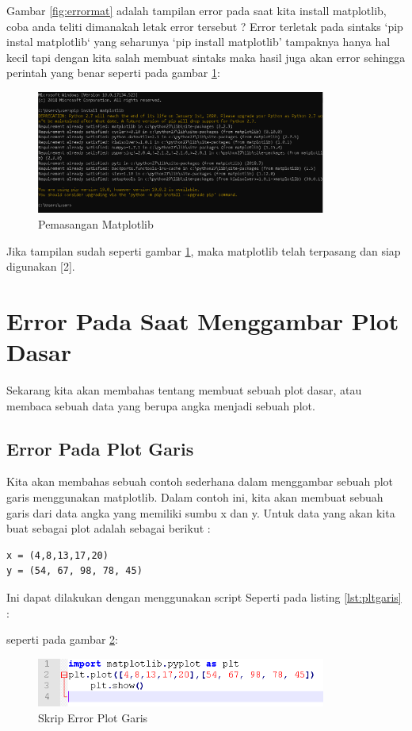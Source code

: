 Gambar \ref{fig:errormat} adalah tampilan error pada saat kita install matplotlib, coba anda teliti dimanakah letak error tersebut ? 
Error terletak pada sintaks ‘pip instal matplotlib‘ yang seharunya ‘pip install matplotlib’ tampaknya hanya hal kecil tapi dengan kita salah membuat sintaks maka hasil juga akan error sehingga perintah yang benar seperti pada gambar \ref{fig:pasangmat}:
\begin{figure}[!htbp]
	\centerline{\includegraphics[width=0.85\textwidth]{figures/6/pasangmat.PNG}}
	\caption{Pemasangan Matplotlib}
	\label{fig:pasangmat}
\end{figure} 

Jika tampilan sudah seperti gambar \ref{fig:pasangmat}, maka matplotlib telah terpasang dan siap digunakan [2].

\section{Error Pada Saat Menggambar Plot Dasar}
Sekarang kita akan membahas tentang membuat sebuah plot dasar, atau membaca sebuah data yang berupa angka menjadi sebuah plot.
\subsection{Error Pada Plot Garis}
Kita akan membahas sebuah contoh sederhana dalam menggambar sebuah plot garis menggunakan matplotlib. Dalam contoh ini, kita akan membuat sebuah garis dari data angka yang memiliki sumbu x dan y.
Untuk data yang akan kita buat sebagai plot adalah sebagai berikut : 
\begin{verbatim}
x = (4,8,13,17,20)
y = (54, 67, 98, 78, 45)
\end{verbatim}
Ini dapat dilakukan dengan menggunakan script Seperti pada listing \ref{lst:pltgaris} : 

seperti pada gambar \ref{fig:errpltgaris}:
\begin{figure}[!htbp]
	\centerline{\includegraphics[width=0.85\textwidth]{figures/6/errpltgaris.PNG}}
	\caption{Skrip Error Plot Garis}
	\label{fig:errpltgaris}
\end{figure}


